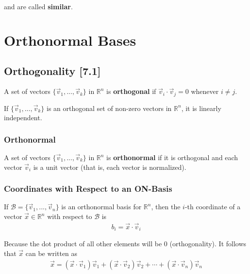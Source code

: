 \documentclass[a4paper,9pt]{extarticle}
\begin{document}
\begin{multicols*}{2}
and are called \textbf{similar}.


\section{Orthonormal Bases}


\subsection{Orthogonality [7.1]}
A set of vectors $\{\vec{v}_1, ..., \vec{v}_k\}$ in $\mathbb{R}^n$ is \textbf{orthogonal} if $\vec{v}_i \cdot \vec{v}_j = 0$ whenever $i \neq j$.

If $\{\vec{v}_1, ..., \vec{v}_k\}$ is an orthogonal set of non-zero vectors in $\mathbb{R}^n$, it is linearly independent.


\subsubsection{Orthonormal}
A set of vectors $\{\vec{v}_1, ..., \vec{v}_k\}$ in $\mathbb{R}^n$ is \textbf{orthonormal} if it is orthogonal and each vector $\vec{v}_i$ is a unit vector (that is, each vector is normalized).


\subsubsection{Coordinates with Respect to an ON-Basis}
If $\mathcal{B} = \{\vec{v}_1, ..., \vec{v}_n\}$ is an orthonormal basis for $\mathbb{R}^n$, then the $i$-th coordinate of a vector $\vec{x} \in \mathbb{R}^n$ with respect to $\mathcal{B}$ is
\begin{equation} \label{7.1-1}
    \begin{split}
        b_i = \vec{x} \cdot \vec{v}_i
    \end{split}
\end{equation}

Because the dot product of all other elements will be 0 (orthogonality). It follows that $\vec{x}$ can be written as
\begin{equation} \label{7.1-2}
    \begin{split}
        \vec{x} = (\vec{x} \cdot \vec{v}_1) \vec{v}_1 + (\vec{x} \cdot \vec{v}_2) \vec{v}_2 + \cdots + (\vec{x} \cdot \vec{v}_n) \vec{v}_n 
    \end{split}
\end{equation}


\end{multicols*}
\end{document}
